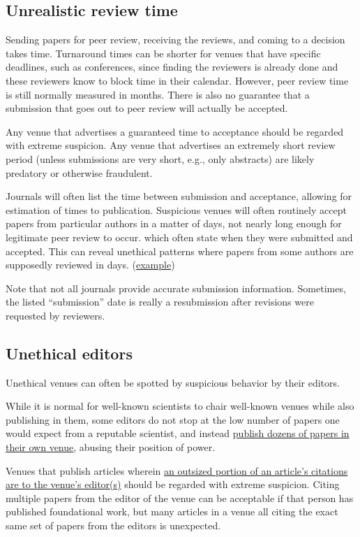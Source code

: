 \documentclass[letterpaper, 12pt]{article}
\begin{document}
\subsection*{Unrealistic review time}

Sending papers for peer review, receiving the reviews, and coming to a decision takes time.
Turnaround times can be shorter for venues that have specific deadlines, such as conferences,
since finding the reviewers is already done and these reviewers know to block time in their calendar.
However, peer review time is still normally measured in months. There is also no guarantee that a submission that goes out to peer review will actually be accepted.

Any venue that advertises a guaranteed time to acceptance should be regarded with extreme suspicion. Any venue that advertises an extremely short review period (unless submissions are very short, e.g., only abstracts) are likely predatory or otherwise fraudulent.

Journals will often list the time between submission and acceptance, allowing for estimation of times to publication. Suspicious venues will often routinely accept papers from particular authors in a matter of days, not nearly long enough for legitimate peer review to occur.
which often state when they were submitted and accepted.
This can reveal unethical patterns where papers from some authors are supposedly reviewed in days.
(\href{https://deevybee.blogspot.com/2015/02/editors-behaving-badly.html}{example})

Note that not all journals provide accurate submission information. Sometimes, the listed ``submission'' date is really a resubmission after revisions were requested by reviewers.

\subsection*{Unethical editors}

Unethical venues can often be spotted by suspicious behavior by their editors.

While it is normal for well-known scientists to chair well-known venues while also publishing in them,
some editors do not stop at the low number of papers one would expect from a reputable scientist,
and instead \href{https://deevybee.blogspot.com/2020/08/pepiops-prolific-editors-who-publish-in.html}{publish dozens of papers in their own venue}, abusing their position of power.

Venues that publish articles wherein \href{https://pubpeer.com/publications/57BB3F8859A0F5BE6FBC4DB70F2E8E}{an outsized portion of an article's citations are to the venue's editor(s)} should be regarded with extreme suspicion. Citing multiple papers from the editor of the venue
can be acceptable if that person has published foundational work,
but many articles in a venue all citing the exact same set of papers from the editors is unexpected.
\end{document}
